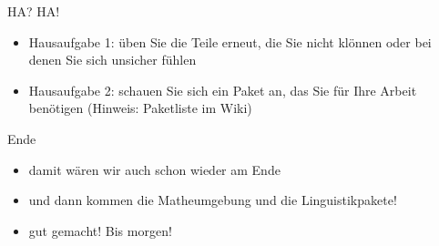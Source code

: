 \begin{frame}[fragile]{HA? HA!}
    \begin{itemize}[<+->]
    \item Hausaufgabe 1: üben Sie die Teile erneut, die Sie nicht klönnen oder bei denen Sie sich unsicher fühlen
    \item Hausaufgabe 2: schauen Sie sich ein Paket an, das Sie für Ihre Arbeit benötigen (Hinweis: Paketliste im Wiki)
    \end{itemize}
\end{frame}

\begin{frame}[fragile]{Ende}
    \begin{itemize}[<+->]
    \item damit wären wir auch schon wieder am Ende
    \item und dann kommen die Matheumgebung und die Linguistikpakete!
    \item gut gemacht! Bis morgen!
    \end{itemize}
\end{frame}


